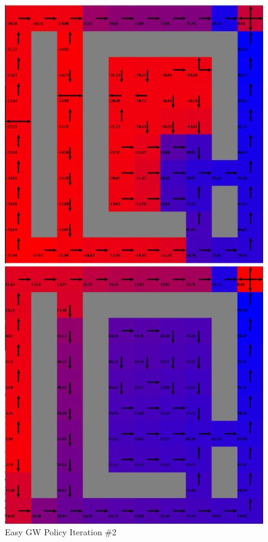 \documentclass[h]{article}
\begin{document}
    \begin{figure}[H]
      \includegraphics[width=1\textwidth,keepaspectratio]{easy-policy-2.png} 
      \caption*{Easy GW Policy Iteration \#2} 
   \endminipage\hfill
      \includegraphics[width=1\textwidth,keepaspectratio]{easy-policy-5.png} 

\end{figure}
\end{document}
